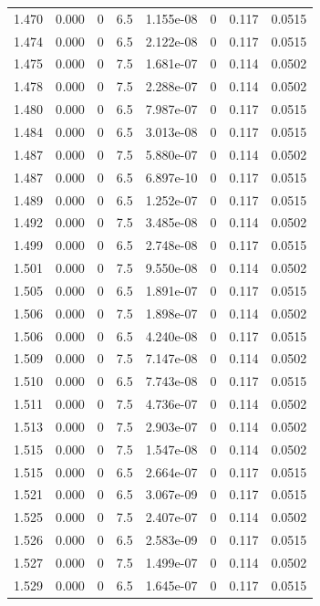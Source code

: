 \documentclass[preview]{standalone}
\begin{document}
{{{{{{{{{{{{{{{{{\begin{tabular}{L{1.2cm}C{1.2cm} C{0.3cm}C{0.5cm} C{1.4cm}C{1.4cm} C{1.4cm}C{1.4cm}}
  1.470  &  0.000  & 0     & 6.5 &  1.155e-08  & 0  & 0.117 &  0.0515   \\ 
  1.474  &  0.000  & 0     & 6.5 &  2.122e-08  & 0  & 0.117 &  0.0515   \\ 
  1.475  &  0.000  & 0     & 7.5 &  1.681e-07  & 0  & 0.114 &  0.0502   \\ 
  1.478  &  0.000  & 0     & 7.5 &  2.288e-07  & 0  & 0.114 &  0.0502   \\ 
  1.480  &  0.000  & 0     & 6.5 &  7.987e-07  & 0  & 0.117 &  0.0515   \\ 
  1.484  &  0.000  & 0     & 6.5 &  3.013e-08  & 0  & 0.117 &  0.0515   \\ 
  1.487  &  0.000  & 0     & 7.5 &  5.880e-07  & 0  & 0.114 &  0.0502   \\ 
  1.487  &  0.000  & 0     & 6.5 &  6.897e-10  & 0  & 0.117 &  0.0515   \\ 
  1.489  &  0.000  & 0     & 6.5 &  1.252e-07  & 0  & 0.117 &  0.0515   \\ 
  1.492  &  0.000  & 0     & 7.5 &  3.485e-08  & 0  & 0.114 &  0.0502   \\ 
  1.499  &  0.000  & 0     & 6.5 &  2.748e-08  & 0  & 0.117 &  0.0515   \\ 
  1.501  &  0.000  & 0     & 7.5 &  9.550e-08  & 0  & 0.114 &  0.0502   \\ 
  1.505  &  0.000  & 0     & 6.5 &  1.891e-07  & 0  & 0.117 &  0.0515   \\ 
  1.506  &  0.000  & 0     & 7.5 &  1.898e-07  & 0  & 0.114 &  0.0502   \\ 
  1.506  &  0.000  & 0     & 6.5 &  4.240e-08  & 0  & 0.117 &  0.0515   \\ 
  1.509  &  0.000  & 0     & 7.5 &  7.147e-08  & 0  & 0.114 &  0.0502   \\ 
  1.510  &  0.000  & 0     & 6.5 &  7.743e-08  & 0  & 0.117 &  0.0515   \\ 
  1.511  &  0.000  & 0     & 7.5 &  4.736e-07  & 0  & 0.114 &  0.0502   \\ 
  1.513  &  0.000  & 0     & 7.5 &  2.903e-07  & 0  & 0.114 &  0.0502   \\ 
  1.515  &  0.000  & 0     & 7.5 &  1.547e-08  & 0  & 0.114 &  0.0502   \\ 
  1.515  &  0.000  & 0     & 6.5 &  2.664e-07  & 0  & 0.117 &  0.0515   \\ 
  1.521  &  0.000  & 0     & 6.5 &  3.067e-09  & 0  & 0.117 &  0.0515   \\ 
  1.525  &  0.000  & 0     & 7.5 &  2.407e-07  & 0  & 0.114 &  0.0502   \\ 
  1.526  &  0.000  & 0     & 6.5 &  2.583e-09  & 0  & 0.117 &  0.0515   \\ 
  1.527  &  0.000  & 0     & 7.5 &  1.499e-07  & 0  & 0.114 &  0.0502   \\ 
  1.529  &  0.000  & 0     & 6.5 &  1.645e-07  & 0  & 0.117 &  0.0515   \\ 
\hline 
\end{tabular} 

}}}}}}}}}}}}}}}}}
\end{document}
